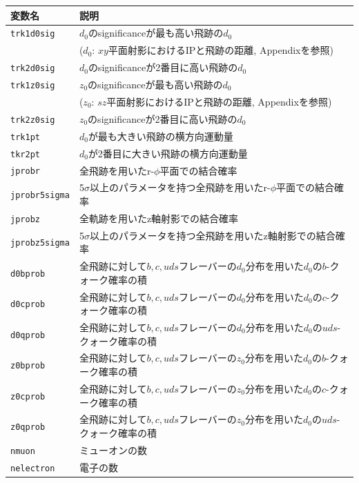 \begin{table}[H]
 \centering
 \small
  \begin{tabular}{ l | l }
   \hline
   変数名 & 説明\\
   \hline \hline
   \texttt{trk1d0sig} & $d_0$のsignificanceが最も高い飛跡の$d_0$ \\
   & ($d_0$: $xy$平面射影におけるIPと飛跡の距離, Appendixを参照)\\
   \texttt{trk2d0sig} & $d_0$のsignificanceが2番目に高い飛跡の$d_0$\\
   \texttt{trk1z0sig} & $z_0$のsignificanceが最も高い飛跡の$d_0$ \\
   & ($z_0$: $sz$平面射影におけるIPと飛跡の距離, Appendixを参照)\\
   \texttt{trk2z0sig} & $z_0$のsignificanceが2番目に高い飛跡の$d_0$\\
   \texttt{trk1pt} & $d_0$が最も大きい飛跡の横方向運動量\\
   \texttt{tkr2pt} & $d_0$が2番目に大きい飛跡の横方向運動量\\
   \texttt{jprobr} & 全飛跡を用いたr-$\phi$平面での結合確率\\
   \texttt{jprobr5sigma} & 5$\sigma$以上のパラメータを持つ全飛跡を用いたr-$\phi$平面での結合確率\\
   \texttt{jprobz} & 全軌跡を用いたz軸射影での結合確率\\
   \texttt{jprobz5sigma} & 5$\sigma$以上のパラメータを持つ全飛跡を用いたz軸射影での結合確率\\
   \texttt{d0bprob} & 全飛跡に対して$b,c,uds$フレーバーの$d_0$分布を用いた$d_0$の$b$-クォーク確率の積\\
   \texttt{d0cprob} & 全飛跡に対して$b,c,uds$フレーバーの$d_0$分布を用いた$d_0$の$c$-クォーク確率の積\\
   \texttt{d0qprob} & 全飛跡に対して$b,c,uds$フレーバーの$d_0$分布を用いた$d_0$の$uds$-クォーク確率の積\\
   \texttt{z0bprob} & 全飛跡に対して$b,c,uds$フレーバーの$z_0$分布を用いた$d_0$の$b$-クォーク確率の積\\
   \texttt{z0cprob} & 全飛跡に対して$b,c,uds$フレーバーの$z_0$分布を用いた$d_0$の$c$-クォーク確率の積\\
   \texttt{z0qprob} & 全飛跡に対して$b,c,uds$フレーバーの$z_0$分布を用いた$d_0$の$uds$-クォーク確率の積\\
   \texttt{nmuon} & ミューオンの数\\
   \texttt{nelectron} & 電子の数\\

\end{tabular}
\end{table}
